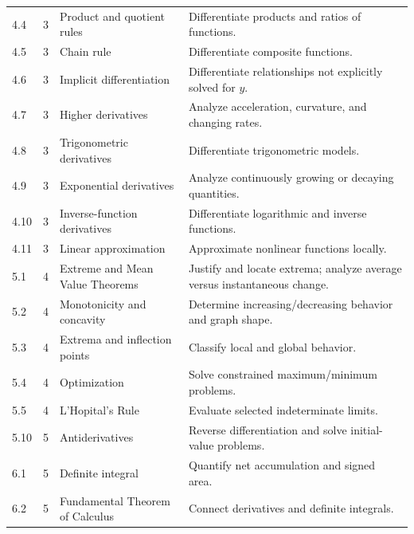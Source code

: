 \documentclass[11pt]{article}
\begin{document}
\begin{longtable}{p{} p{} p{} p{}}
4.4 & 3 & Product and quotient rules & Differentiate products and ratios of functions. \\

4.5 & 3 & Chain rule & Differentiate composite functions. \\

4.6 & 3 & Implicit differentiation & Differentiate relationships not explicitly solved for $y$. \\

4.7 & 3 & Higher derivatives & Analyze acceleration, curvature, and changing rates. \\

4.8 & 3 & Trigonometric derivatives & Differentiate trigonometric models. \\

4.9 & 3 & Exponential derivatives & Analyze continuously growing or decaying quantities. \\

4.10 & 3 & Inverse-function derivatives & Differentiate logarithmic and inverse functions. \\

4.11 & 3 & Linear approximation & Approximate nonlinear functions locally. \\

5.1 & 4 & Extreme and Mean Value Theorems & Justify and locate extrema; analyze average versus instantaneous change. \\

5.2 & 4 & Monotonicity and concavity & Determine increasing/decreasing behavior and graph shape. \\

5.3 & 4 & Extrema and inflection points & Classify local and global behavior. \\

5.4 & 4 & Optimization & Solve constrained maximum/minimum problems. \\

5.5 & 4 & L'Hopital's Rule & Evaluate selected indeterminate limits. \\

5.10 & 5 & Antiderivatives & Reverse differentiation and solve initial-value problems. \\

6.1 & 5 & Definite integral & Quantify net accumulation and signed area. \\

6.2 & 5 & Fundamental Theorem of Calculus & Connect derivatives and definite integrals. \\


\end{longtable}
\end{document}
